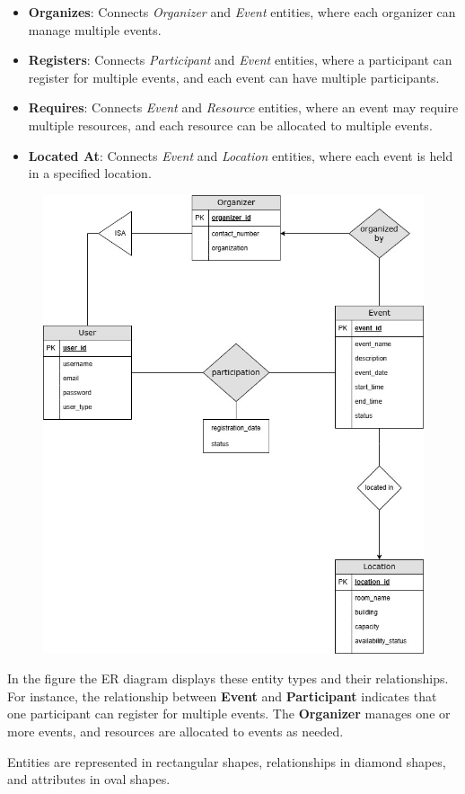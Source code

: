 \begin{itemize}
    \item \textbf{Organizes}: Connects \textit{Organizer} and \textit{Event} entities, where each organizer can manage multiple events.
    \item \textbf{Registers}: Connects \textit{Participant} and \textit{Event} entities, where a participant can register for multiple events, and each event can have multiple participants.
    \item \textbf{Requires}: Connects \textit{Event} and \textit{Resource} entities, where an event may require multiple resources, and each resource can be allocated to multiple events.
    \item \textbf{Located At}: Connects \textit{Event} and \textit{Location} entities, where each event is held in a specified location.
\end{itemize}
\begin{figure}[h]
    \centering
    \includegraphics[scale=0.4]{images/Event_Management2.jpg}
\end{figure}
In the figure the ER diagram displays these entity types and their relationships. For instance, the relationship between \textbf{Event} and \textbf{Participant} indicates that one participant can register for multiple events. The \textbf{Organizer} manages one or more events, and resources are allocated to events as needed.

Entities are represented in rectangular shapes, relationships in diamond shapes, and attributes in oval shapes.
